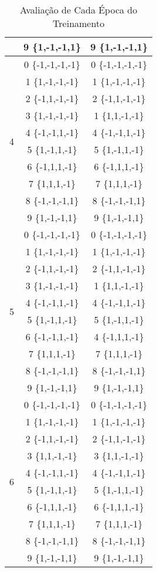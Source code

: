 \begin{table}[H]
\begin{tabular}{|c|c|c|}
	 & 9 \{1,-1,-1,1\} & 9 \{1,-1,-1,1\} \\\hline
\multirow{10}{*}{4}	 & 0 \{-1,-1,-1,-1\} & 0 \{-1,-1,-1,-1\} \\
	 & 1 \{1,-1,-1,-1\} & 1 \{1,-1,-1,-1\} \\
	 & 2 \{-1,1,-1,-1\} & 2 \{-1,1,-1,-1\} \\
	 & 3 \{1,-1,-1,-1\} & 1 \{1,1,-1,-1\} \\
	 & 4 \{-1,-1,1,-1\} & 4 \{-1,-1,1,-1\} \\
	 & 5 \{1,-1,1,-1\} & 5 \{1,-1,1,-1\} \\
	 & 6 \{-1,1,1,-1\} & 6 \{-1,1,1,-1\} \\
	 & 7 \{1,1,1,-1\} & 7 \{1,1,1,-1\} \\
	 & 8 \{-1,-1,-1,1\} & 8 \{-1,-1,-1,1\} \\
	 & 9 \{1,-1,-1,1\} & 9 \{1,-1,-1,1\} \\\hline
\multirow{10}{*}{5}	 & 0 \{-1,-1,-1,-1\} & 0 \{-1,-1,-1,-1\} \\
	 & 1 \{1,-1,-1,-1\} & 1 \{1,-1,-1,-1\} \\
	 & 2 \{-1,1,-1,-1\} & 2 \{-1,1,-1,-1\} \\
	 & 3 \{1,-1,-1,-1\} & 1 \{1,1,-1,-1\} \\
	 & 4 \{-1,-1,1,-1\} & 4 \{-1,-1,1,-1\} \\
	 & 5 \{1,-1,1,-1\} & 5 \{1,-1,1,-1\} \\
	 & 6 \{-1,-1,1,-1\} & 4 \{-1,1,1,-1\} \\
	 & 7 \{1,1,1,-1\} & 7 \{1,1,1,-1\} \\
	 & 8 \{-1,-1,-1,1\} & 8 \{-1,-1,-1,1\} \\
	 & 9 \{1,-1,-1,1\} & 9 \{1,-1,-1,1\} \\\hline
\multirow{10}{*}{6}	 & 0 \{-1,-1,-1,-1\} & 0 \{-1,-1,-1,-1\} \\
	 & 1 \{1,-1,-1,-1\} & 1 \{1,-1,-1,-1\} \\
	 & 2 \{-1,1,-1,-1\} & 2 \{-1,1,-1,-1\} \\
	 & 3 \{1,1,-1,-1\} & 3 \{1,1,-1,-1\} \\
	 & 4 \{-1,-1,1,-1\} & 4 \{-1,-1,1,-1\} \\
	 & 5 \{1,-1,1,-1\} & 5 \{1,-1,1,-1\} \\
	 & 6 \{-1,1,1,-1\} & 6 \{-1,1,1,-1\} \\
	 & 7 \{1,1,1,-1\} & 7 \{1,1,1,-1\} \\
	 & 8 \{-1,-1,-1,1\} & 8 \{-1,-1,-1,1\} \\
	 & 9 \{1,-1,-1,1\} & 9 \{1,-1,-1,1\} \\\hline
\end{tabular}
\caption{Avaliação de Cada Época do Treinamento}
\label{tab:e1}
\end{table}
